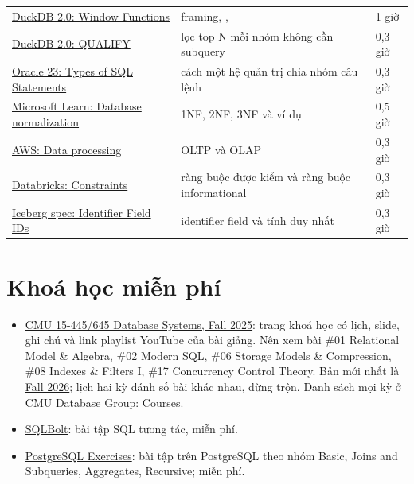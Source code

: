 \begin{xltabular}{\textwidth}{@{}P{4.2cm} L P{1.8cm}@{}}
\href{https://duckdb.org/docs/2.0/sql/functions/window_functions}{DuckDB 2.0: Window Functions} & framing, ,  & 1 giờ \\
\href{https://duckdb.org/docs/2.0/sql/query_syntax/qualify}{DuckDB 2.0: QUALIFY} & lọc top N mỗi nhóm không cần subquery & 0,3 giờ \\
\href{https://docs.oracle.com/en/database/oracle/oracle-database/23/sqlrf/Types-of-SQL-Statements.html}{Oracle 23: Types of SQL Statements} & cách một hệ quản trị chia nhóm câu lệnh & 0,3 giờ \\
\href{https://learn.microsoft.com/en-us/troubleshoot/office/access/database-normalization-description}{Microsoft Learn: Database normalization} & 1NF, 2NF, 3NF và ví dụ & 0,5 giờ \\
\href{https://docs.aws.amazon.com/whitepapers/latest/data-warehousing-on-aws/data-processing.html}{AWS: Data processing} & OLTP và OLAP & 0,3 giờ \\
\href{https://docs.databricks.com/aws/en/tables/constraints}{Databricks: Constraints} & ràng buộc được kiểm và ràng buộc informational & 0,3 giờ \\
\href{https://iceberg.apache.org/spec/\#identifier-field-ids}{Iceberg spec: Identifier Field IDs} & identifier field và tính duy nhất & 0,3 giờ \\
\end{xltabular}

\section{Khoá học miễn phí}

\begin{itemize}
  \item \href{https://15445.courses.cs.cmu.edu/fall2025/}{CMU 15-445/645 Database Systems, Fall 2025}: trang khoá học có lịch, slide, ghi chú và link playlist YouTube của bài giảng. Nên xem bài \#01 Relational Model \& Algebra, \#02 Modern SQL, \#06 Storage Models \& Compression, \#08 Indexes \& Filters I, \#17 Concurrency Control Theory. Bản mới nhất là \href{https://15445.courses.cs.cmu.edu/fall2026/}{Fall 2026}; lịch hai kỳ đánh số bài khác nhau, đừng trộn. Danh sách mọi kỳ ở \href{https://db.cs.cmu.edu/courses/}{CMU Database Group: Courses}.
  \item \href{https://sqlbolt.com/}{SQLBolt}: bài tập SQL tương tác, miễn phí.
  \item \href{https://pgexercises.com/}{PostgreSQL Exercises}: bài tập trên PostgreSQL theo nhóm Basic, Joins and Subqueries, Aggregates, Recursive; miễn phí.
\end{itemize}

